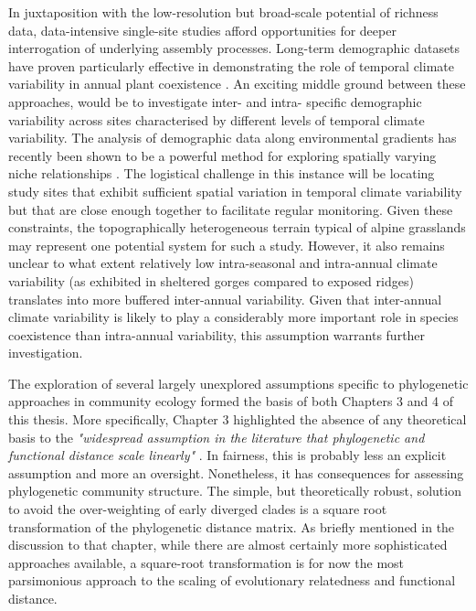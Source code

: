 In juxtaposition with the low-resolution but broad-scale potential of richness data, data-intensive single-site studies afford opportunities for deeper interrogation of underlying assembly processes. Long-term demographic datasets have proven particularly effective in demonstrating the role of temporal climate variability in annual plant coexistence \citep{Adler2006, Adler2009, Angert2009}. An exciting middle ground between these approaches, would be to investigate inter- and intra- specific demographic variability across sites characterised by different levels of temporal climate variability. The analysis of demographic data along environmental gradients has recently been shown to be a powerful method for exploring spatially varying niche relationships \citep{Diez2014}. The logistical challenge in this instance will be locating study sites that exhibit sufficient spatial variation in temporal climate variability but that are close enough together to facilitate regular monitoring. Given these constraints, the topographically heterogeneous terrain typical of alpine grasslands may represent one potential system for such a study. However, it also remains unclear to what extent relatively low intra-seasonal and intra-annual climate variability (as exhibited in sheltered gorges compared to exposed ridges) translates into more buffered inter-annual variability. Given that inter-annual climate variability is likely to play a considerably more important role in species coexistence than intra-annual variability, this assumption warrants further investigation.  

The exploration of several largely unexplored assumptions specific to phylogenetic approaches in community ecology formed the basis of both Chapters 3 and 4 of this thesis. More specifically, Chapter 3 highlighted the absence of any theoretical basis to the \textit{"widespread assumption in the literature that phylogenetic and functional distance scale linearly"} \citep{Letten2014}. In fairness, this is probably less an explicit assumption and more an oversight. Nonetheless, it has consequences for assessing phylogenetic community structure. The simple, but theoretically robust, solution to avoid the over-weighting of early diverged clades is a square root transformation of the phylogenetic distance matrix. As briefly mentioned in the discussion to that chapter, while there are almost certainly more sophisticated approaches available, a square-root transformation is for now the most parsimonious approach to the scaling of evolutionary relatedness and functional distance. 

